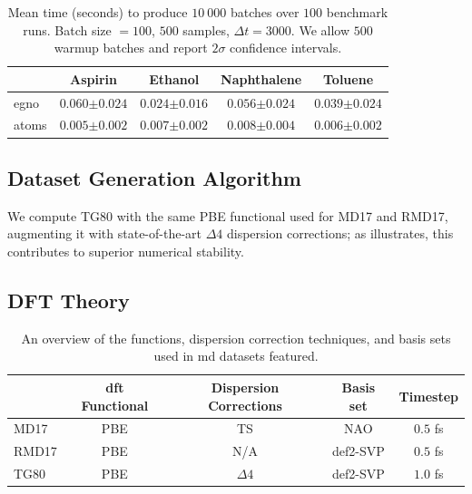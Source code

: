 \begin{table}[ht]
    \centering
    \caption{Mean time (seconds) to produce \(10\ 000\) batches over \(100\) benchmark runs. Batch size \(= 100\), \(500\) samples, \(\Delta t = 3000\). We allow \(500\) warmup batches and report \(2\sigma\) confidence intervals.}
    \label{tab:dataloader_perf}
    \begin{tabular}{lcccc}
        \toprule
         & Aspirin & Ethanol & Naphthalene & Toluene \\
         \midrule
         \gls{egno} & \(0.060{\scriptstyle \pm0.024}\) & \(0.024{\scriptstyle \pm0.016}\) & \(0.056{\scriptstyle \pm0.024}\) & \(0.039{\scriptstyle \pm0.024}\) \\
         \gls{atoms} & \(0.005{\scriptstyle \pm0.002}\) & \(0.007{\scriptstyle \pm0.002}\) & \(0.008{\scriptstyle \pm0.004}\) & \(0.006{\scriptstyle \pm0.002}\) \\
         \bottomrule
    \end{tabular}
\end{table}

\subsection{Dataset Generation Algorithm}
We compute TG80 with the same PBE functional used for MD17 and RMD17, augmenting it with state-of-the-art \(\Delta 4\) dispersion corrections; as  illustrates, this contributes to superior numerical stability.

\subsection{DFT Theory}
\begin{table}[H]
    \centering
    \caption{An overview of the functions, dispersion correction techniques, and basis sets used in \gls{md} datasets featured.}
    \label{tab:dft_techniques}
    \begin{tabular}{lcccc}
        \toprule
        & \gls{dft} Functional & Dispersion Corrections & Basis set & Timestep \\
        \midrule
        MD17 \cite{chmiela_machine_2017} & PBE & TS & NAO & \(0.5\) fs \\
        RMD17 \cite{christensen_role_2020} & PBE & N/A & def2-SVP & \(0.5\) fs \\
        TG80 & PBE & \(\Delta 4\) & def2-SVP & \(1.0\) fs \\
        \bottomrule
    \end{tabular}
\end{table}

